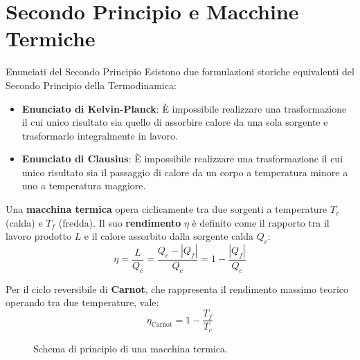 \section{Secondo Principio e Macchine Termiche}

\begin{teorema}{Enunciati del Secondo Principio}
Esistono due formulazioni storiche equivalenti del Secondo Principio della Termodinamica:
\begin{itemize}
    \item \textbf{Enunciato di Kelvin-Planck}: È impossibile realizzare una trasformazione il cui unico risultato sia quello di assorbire calore da una sola sorgente e trasformarlo integralmente in lavoro.
    \item \textbf{Enunciato di Clausius}: È impossibile realizzare una trasformazione il cui unico risultato sia il passaggio di calore da un corpo a temperatura minore a uno a temperatura maggiore.
\end{itemize}
\end{teorema}

\medskip
Una \textbf{macchina termica} opera ciclicamente tra due sorgenti a temperature $T_c$ (calda) e $T_f$ (fredda). Il suo \textbf{rendimento} $\eta$ è definito come il rapporto tra il lavoro prodotto $L$ e il calore assorbito dalla sorgente calda $Q_c$:
\begin{equation}
    \eta = \frac{L}{Q_c} = \frac{Q_c - |Q_f|}{Q_c} = 1 - \frac{|Q_f|}{Q_c}
\end{equation}

Per il ciclo reversibile di \textbf{Carnot}, che rappresenta il rendimento massimo teorico operando tra due temperature, vale:
\begin{equation}
    \eta_{\text{Carnot}} = 1 - \frac{T_f}{T_c}
\end{equation}

\begin{figure}[ht]
\centering
{}
\caption{Schema di principio di una macchina termica.}
\end{figure}

